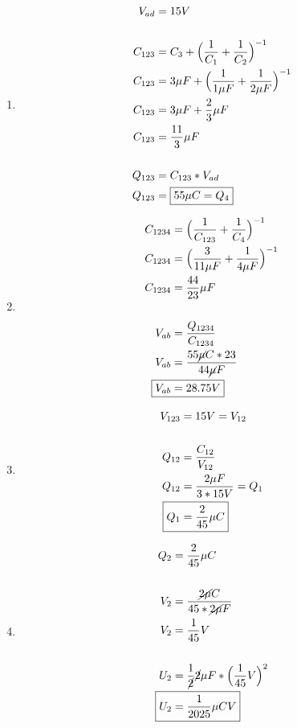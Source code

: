 \documentclass[10pt, twoside]{article}
\begin{document}
	\begin{enumerate}[label=\alph*.]
		\item
			\begin{align*}
				V_{ad} &= 15V\\
				\\
				C_{123} &= C_3+\Big{(} \frac{1}{C_1}+ \frac{1}{C_2}  \Big{)}^{-1}\\
				C_{123} &= 3\mu F+\Big{(} \frac{1}{1\mu F}+ \frac{1}{2\mu F}  \Big{)}^{-1}\\
				C_{123} &= 3\mu F+ \frac{2}{3} \mu F\\
				C_{123} &= \frac{11}{3} \mu F\\
				\\
				Q_{123} &= C_{123}*V_{ad}\\
				Q_{123} &=
				\boxed
				{
					55\mu C = Q_4
				}
			\end{align*}
		\item
			\begin{align*}
				C_{1234} &= \Big{(} \frac{1}{C_{123}}+ \frac{1}{C_4}  \Big{)}^{-1}\\
				C_{1234} &= \Big{(} \frac{3}{11\mu F}+ \frac{1}{4\mu F}  \Big{)}^{-1}\\
				C_{1234} &= \frac{44}{23} \mu F\\
				\\
				V_{ab} &= \frac{Q_{1234}}{C_{1234}}\\
				V_{ab} &= \frac{55\cancel{\mu}C*23}{44\cancel{\mu}F}\\
				\Aboxed
				{
					V_{ab} &= 28.75V
				}
			\end{align*}
		\item
			\begin{align*}
				V_{123} &= 15V = V_{12}\\
				\\
				Q_{12} &= \frac{C_{12}}{V_{12}} \\
				Q_{12} &= \frac{ 2\mu F }{3*15V} = Q_1\\
				\Aboxed
				{
					Q_1 &= \frac{2}{45} \mu C
				}
			\end{align*}
		\item
			\begin{align*}
					Q_2 &= \frac{2}{45} \mu C\\
					\\
					V_2 &= \frac{\cancel{2\mu} C}{45*\cancel{2\mu} F}\\
					V_2 &= \frac{1}{45}V \\
					\\
					U_2 &= \frac{1}{\cancel{2}} \cancel{2}\mu F*\Big{(} \frac{1}{45}V \Big{)}^2\\
					\Aboxed
					{
						U_2 &= \frac{1}{2025}\mu CV
					}
			\end{align*}
	\end{enumerate}
\end{document}
